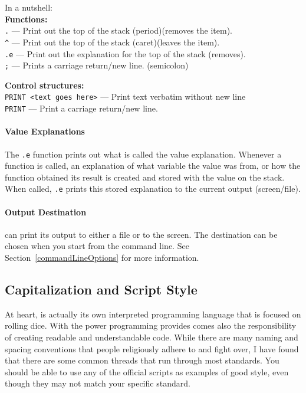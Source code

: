 \noindent In a nutshell:\\
\textbf{Functions:}\\
\texttt{.} --- Print out the top of the stack (period)(removes the item).\\
\texttt{\^} --- Print out the top of the stack (caret)(leaves the item).\\
\texttt{.e} --- Print out the explanation for the top of the stack (removes).\\
\texttt{;} --- Prints a carriage return/new line. (semicolon)

\noindent\textbf{Control structures:}\\
\texttt{PRINT <text goes here>} --- Print text verbatim without new line\\
\texttt{PRINT} --- Print a carriage return/new line.

\paragraph*{Value Explanations\\}
\hspace*{\parindent}%
The \texttt{.e} function prints out what is called the value explanation.
Whenever a function is called, an explanation of what variable the value was
from, or how the function obtained its result is created and stored with the
value on the stack. When called, \texttt{.e} prints this stored explanation
to the current output (screen/file).

\paragraph*{Output Destination\\}
\hspace*{\parindent}%
\progLogo can print its output to either a file or to the screen.
The destination can be chosen when you start \progLogo from the command line.
See Section~\ref{commandLineOptions} for more information.

\subsection{Capitalization and Script Style}
\label{codingStyle}
At heart, \progLogo is actually its own interpreted programming language that
is focused on rolling dice. With the power programming provides comes also
the responsibility of creating readable and understandable code. While there
are many naming and spacing conventions that people religiously adhere to and
fight over, I have found that there are some common threads that run through
most standards. You should be able to use any of the official \progLogo scripts
as examples of good style, even though they may not match your specific
standard.

